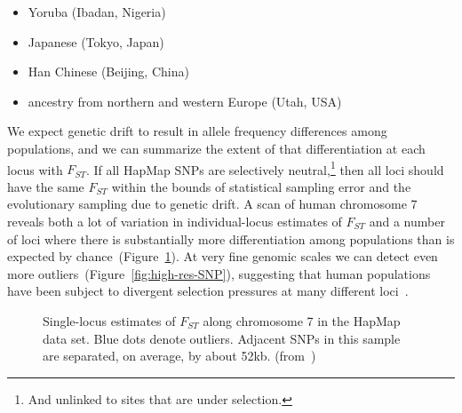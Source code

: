 \begin{itemize}

\item Yoruba (Ibadan, Nigeria)

\item Japanese (Tokyo, Japan)

\item Han Chinese (Beijing, China)

\item ancestry from northern and western Europe (Utah, USA)

\end{itemize}

We expect genetic drift to result in allele frequency differences
among populations, and we can summarize the extent of that
differentiation at each locus with $F_{ST}$. If all HapMap SNPs are
selectively neutral,\footnote{And unlinked to sites that are under
  selection.} then all loci should have the same $F_{ST}$ within the
bounds of statistical sampling error and the evolutionary sampling due
to genetic drift. A scan of human chromosome 7 reveals both a lot of
variation in individual-locus estimates of $F_{ST}$ and a number of
loci where there is substantially more differentiation among
populations than is expected by
chance~(Figure~\ref{fig:low-res-SNP}). At very fine genomic scales we
can detect even more outliers~(Figure~\ref{fig:high-res-SNP}),
suggesting that human populations have been subject to divergent
selection pressures at many different loci~\cite{Guo-etal-2009}.

\begin{figure}
\begin{center}
\end{center}
\caption{Single-locus estimates of $F_{ST}$ along chromosome 7 in the
  HapMap data set. Blue dots denote outliers. Adjacent SNPs in this
  sample are separated, on average, by about
  52kb. (from~\cite{Guo-etal-2009})}\label{fig:low-res-SNP}
\end{figure}

